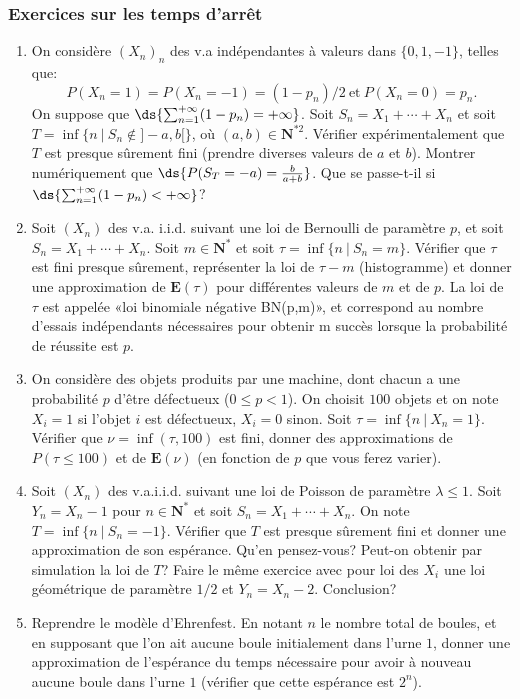 {{%
\subsubsection{Exercices sur les temps d'arrêt}
%

\begin{enumerate}
\item On considère $(X_n)_n$ des v.a indépendantes à valeurs dans
  $\{0,1,-1\}$, telles que:
  $$
  P(X_n=1)=P(X_n=-1)=(1-p_n)/2~\mbox{et}~ P(X_n=0)=p_n.$$
  On suppose que
  $\ds{\sum _{n=1} ^{+\infty}(1-p_n)=+\infty}$. Soit
  $S_n=X_1+\cdots+X_n$ et soit $T=\inf \{n~|~S_n \notin ]-a,b[\}$, où
  $(a,b)\in \mathbf{N}^{*2}$. Vérifier expérimentalement que $T$ est presque
  sûrement fini (prendre diverses valeurs de $a$ et $b$). Montrer
  numériquement que $\ds{P(S_T=-a)=\frac b {a+b}}$. Que se
  passe-t-il si $\ds{\sum _{n=1} ^{+\infty}(1-p_n)<+\infty}$?
\item Soit $(X_n)$ des v.a. i.i.d. suivant une loi de Bernoulli de paramètre
  $p$, et soit $S_n=X_1+\cdots+X_n$. Soit $m \in \mathbf{N}^*$ et soit
  $\tau=\inf \{n~|~S_n=m\}$. Vérifier que $\tau$ est fini presque sûrement,
  représenter la loi de $\tau-m$ (histogramme) et donner une approximation de
  $\mathbf{E}(\tau)$ pour différentes valeurs de $m$ et de $p$. La loi de
  $\tau$ est appelée «loi binomiale négative BN(p,m)», et correspond au nombre
  d'essais indépendants nécessaires pour obtenir m succès lorsque la
  probabilité de réussite est $p$.
\item On considère des objets produits par une machine, dont chacun a une
  probabilité $p$ d'être défectueux ($0 \leq p <1$). On choisit $100$ objets
  et on note $X_i=1$ si l'objet $i$ est défectueux, $X_i=0$ sinon. Soit
  $\tau=\inf \{n~|~X_n=1\}$. Vérifier que $\nu=\inf(\tau,100)$ est fini,
  donner des approximations de $P(\tau \leq 100)$ et de $\mathbf{E}(\nu)$ (en
  fonction de $p$ que vous ferez varier). 
\item Soit $(X_n)$ des v.a.i.i.d. suivant une loi de Poisson de paramètre
  $\lambda \leq 1$. Soit $Y_n=X_n-1$ pour $n \in \mathbf{N}^*$ et soit
  $S_n=X_1+\cdots+X_n$. On note $T=\inf \{n~|~S_n =-1\}$. Vérifier que $T$ est
  presque sûrement fini et donner une approximation de son espérance. Qu'en
  pensez-vous? Peut-on obtenir par simulation la loi de $T$? Faire le même
  exercice avec pour loi des $X_i$ une loi géométrique de paramètre $1/2$ et
  $Y_n=X_n-2$. Conclusion?
\item Reprendre le modèle d'Ehrenfest. En notant $n$ le nombre total de
  boules, et en supposant que l'on ait aucune boule initialement dans l'urne
  $1$, donner une approximation de l'espérance du temps nécessaire pour avoir
  à nouveau aucune boule dans l'urne $1$ (vérifier que cette espérance est
  $2^n$).
\end{enumerate}    

}}
